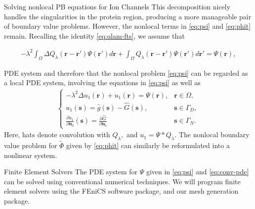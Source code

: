 \documentclass{beamer}
\newcommand{\Phit}{\tilde{\Phi}}
\newcommand{\rr}{{\mathbf r}}
\newcommand{\s}{{\mathbf s}}
\newcommand{\nn}{{\mathbf n}}
\begin{document}
\begin{frame}{Solving nonlocal PB equations for Ion Channels}
    This decomposition nicely handles the singularities in the protein region, producing a more manageable pair of boundary value problems. However, the nonlocal terms in \eqref{eq:psi} and \eqref{eq:phit} remain. Recalling the identity \eqref{eq:qlam-fts}, we assume that  


    \begin{align}
        -\lambda^2 \int_{\Omega} \Delta Q_\lambda (\rr - \rr') \Psi(\rr')d\rr + \int_{\Omega} Q_\lambda(\rr - \rr') \Psi(\rr')d\rr' = \Psi(\rr),
    \end{align}
\end{frame}
\begin{frame}{PDE system}
    and therefore that the nonlocal problem \eqref{eq:psi} can be regarded as a local PDE system, involving the equations in \eqref{eq:psi} as well as 
    \begin{align}
        \begin{cases}\label{eq:conv-pde}
        -\lambda^2 \Delta u_1(\rr) + u_1(\rr) = \Psi(\rr), &\rr \in \Omega, \\
        u_1 (\s) = \hat g(\s) - \hat G(\s), & \s \in \Gamma_D, \\
        \frac{\partial u_1}{\partial \nn_b} (\s) = \frac{\partial \hat G}{\partial \nn_b} & \s \in \Gamma_N.
        \end{cases}
    \end{align}
    Here, hats denote convolution with $Q_\lambda,$ and $u_1 = \Psi * Q_\lambda.$ The nonlocal boundary value problem for $\Phit$ given by \eqref{eq:phit} can similarly be reformulated into a nonlinear system. 
\end{frame}
\begin{frame}{Finite Element Solvers}
    The PDE system for $\Psi$ given in \eqref{eq:psi} and \eqref{eq:conv-pde} can be solved using conventional numerical techniques. We will program finite element solvers using the FEniCS software package, and our mesh generation package. 
\end{frame}
\end{document}
